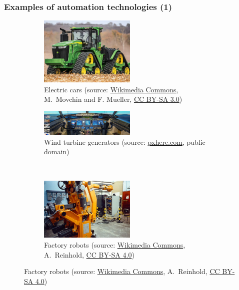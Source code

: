 \begin{frame}
	\frametitle{Examples of automation technologies (1)}
	\begin{figure}
		\centering
		\begin{subfigure}[b]{0.49\textwidth}
			\centering
			\includegraphics[width=0.5\textwidth]{fig/lec01/Tractor.png}
			\caption{Electric cars (source: \href{https://commons.wikimedia.org/wiki/File:Electric_Car_recharging.jpg}{Wikimedia Commons}, M.~Movchin and F. Mueller, \href{https://creativecommons.org/licenses/by-sa/3.0/deed.en}{CC BY-SA 3.0})}
		\end{subfigure}
		\hfill
		\begin{subfigure}[b]{0.49\textwidth}
			\centering
			\includegraphics[width=0.5\textwidth]{fig/lec01/Airplane.png}
			\caption{Wind turbine generators (source: \href{https://pxhere.com/en/photo/954757}{pxhere.com}, public domain)}
		\end{subfigure}
		\\
		\begin{subfigure}[b]{0.49\textwidth}
			\centering
			\includegraphics[width=0.5\textwidth]{fig/lec01/Automatix_KukaRobot.jpg}
			\caption{Factory robots (source: \href{https://commons.wikimedia.org/wiki/File:Automatix_KukaRobot483.agr.jpg}{Wikimedia Commons}, A.~Reinhold, \href{https://creativecommons.org/licenses/by-sa/4.0/deed.en}{CC BY-SA 4.0})}
		\end{subfigure}

\end{figure}
\end{frame}
